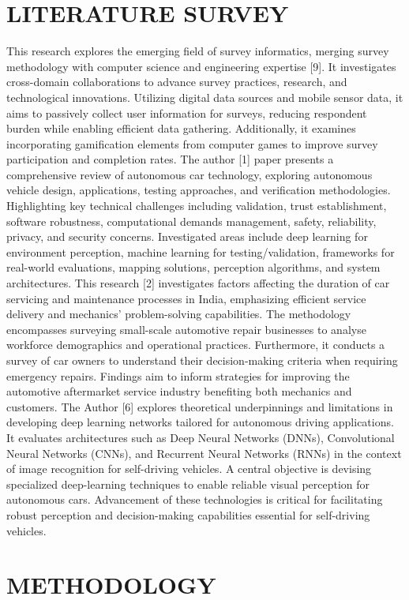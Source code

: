 \documentclass[conference]{IEEEtran}
\begin{document}
\section{LITERATURE SURVEY}
This research explores the emerging field of survey informatics, merging survey methodology with computer science and engineering expertise [9]. It investigates cross-domain collaborations to advance survey practices, research, and technological innovations. Utilizing digital data sources and mobile sensor data, it aims to passively collect user information for surveys, reducing respondent burden while enabling efficient data gathering. Additionally, it examines incorporating gamification elements from computer games to improve survey participation and completion rates.
The author [1] paper presents a comprehensive review of autonomous car technology, exploring autonomous vehicle design, applications, testing approaches, and verification methodologies. Highlighting key technical challenges including validation, trust establishment, software robustness, computational demands management, safety, reliability, privacy, and security concerns. Investigated areas include deep learning for environment perception, machine learning for testing/validation, frameworks for real-world evaluations, mapping solutions, perception algorithms, and system architectures.
This research [2] investigates factors affecting the duration of car servicing and maintenance processes in India, emphasizing efficient service delivery and mechanics' problem-solving capabilities. The methodology encompasses surveying small-scale automotive repair businesses to analyse workforce demographics and operational practices. Furthermore, it conducts a survey of car owners to understand their decision-making criteria when requiring emergency repairs. Findings aim to inform strategies for improving the automotive aftermarket service industry benefiting both mechanics and customers.
The Author [6] explores theoretical underpinnings and limitations in developing deep learning networks tailored for autonomous driving applications. It evaluates architectures such as Deep Neural Networks (DNNs), Convolutional Neural Networks (CNNs), and Recurrent Neural Networks (RNNs) in the context of image recognition for self-driving vehicles. A central objective is devising specialized deep-learning techniques to enable reliable visual perception for autonomous cars. Advancement of these technologies is critical for facilitating robust perception and decision-making capabilities essential for self-driving vehicles. 
\section{METHODOLOGY}
\end{document}
